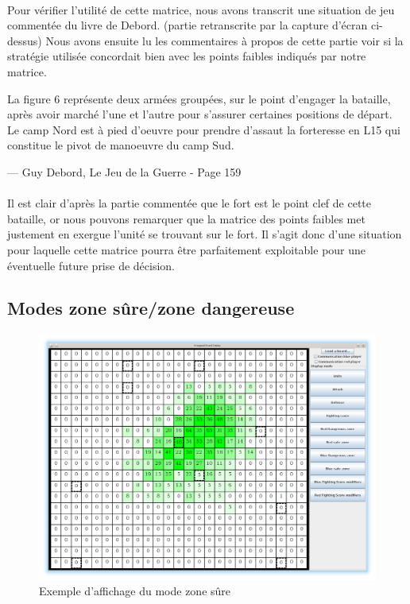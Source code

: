 			\paragraph{}
			Pour vérifier l'utilité de cette matrice, nous avons transcrit une situation de jeu commentée du livre de Debord.\cite{ref2} (partie retranscrite
			par la capture d'écran ci-dessus) Nous avons ensuite lu les commentaires à propos de cette partie voir si la stratégie utilisée concordait bien
			avec les points faibles indiqués par notre matrice.

			\epigraph{La figure 6 représente deux armées groupées, sur le point d'engager la bataille, après avoir marché l'une et l'autre pour s'assurer certaines positions
			de départ. Le camp Nord est à pied d'oeuvre pour prendre d'assaut la forteresse en L15 qui constitue le pivot de manoeuvre du camp Sud.}{--- \textup{Guy Debord}, Le Jeu de la Guerre - Page 159}
						
			\paragraph{}
			Il est clair d'après la partie commentée que le fort est le point clef de cette bataille, or nous pouvons remarquer que la matrice des points faibles
			met justement en exergue l'unité se trouvant sur le fort. Il s'agit donc d'une situation pour laquelle cette matrice pourra être parfaitement exploitable
			pour une éventuelle future prise de décision.	
			
			\clearpage	

		\subsection{Modes zone sûre/zone dangereuse}
			\begin{figure}[!h]
				\centerline{\includegraphics[scale=0.4]{images/screen_safe.png}}
				\caption{Exemple d'affichage du mode zone sûre}
			\end{figure}

